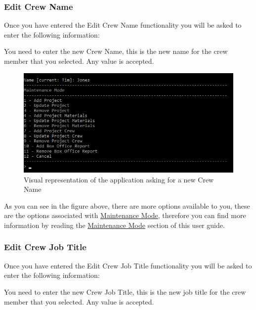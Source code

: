 \documentclass[
  english,
  a4paper,
,tablecaptionabove
]{scrartcl}
\begin{document}
\hypertarget{edit-crew-name-2}{%
\subsubsection{Edit Crew Name}\label{edit-crew-name-2}}

Once you have entered the Edit Crew Name functionality you will be asked
to enter the following information:

You need to enter the new Crew Name, this is the new name for the crew
member that you selected. Any value is accepted.

\begin{figure}
\centering
\includegraphics{images/user-guide/maintenance-mode/update-crew-name.png}
\caption{Visual representation of the application asking for a new Crew
Name}
\end{figure}

As you can see in the figure above, there are more options available to
you, these are the options associated with
\protect\hyperlink{using-maintenance-mode}{Maintenance Mode}, therefore
you can find more information by reading the
\protect\hyperlink{using-maintenance-mode}{Maintenance Mode} section of
this user guide.

\newpage

\hypertarget{edit-crew-job-title-2}{%
\subsubsection{Edit Crew Job Title}\label{edit-crew-job-title-2}}

Once you have entered the Edit Crew Job Title functionality you will be
asked to enter the following information:

You need to enter the new Crew Job Title, this is the new job title for
the crew member that you selected. Any value is accepted.
\end{document}
